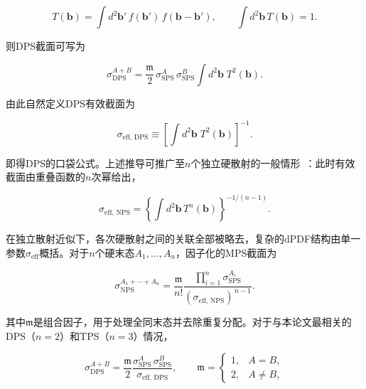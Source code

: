 \begin{equation}
  \label{eq:overlap-function}
  T(\mathbf{b}) = \int d^2\mathbf{b}' \, f(\mathbf{b}') \, f(\mathbf{b} - \mathbf{b}') ,
  \qquad
  \int d^2\mathbf{b} \, T(\mathbf{b}) = 1 .
\end{equation}

则DPS截面可写为

\begin{equation}
  \label{eq:dps-factorized-result}
  \sigma_{\mathrm{DPS}}^{A+B}
  =
  \frac{\mathfrak{m}}{2} \,
  \sigma_{\mathrm{SPS}}^{A} \,
  \sigma_{\mathrm{SPS}}^{B}
  \int d^2\mathbf{b} \; T^2(\mathbf{b}) .
\end{equation}

由此自然定义DPS有效截面为

\begin{equation}
  \label{eq:sigma-eff-dps-def}
  \sigma_{\mathrm{eff},\,\mathrm{DPS}} \equiv \left[ \int d^2\mathbf{b} \; T^2(\mathbf{b}) \right]^{-1} .
\end{equation}

即得DPS的口袋公式。上述推导可推广至$n$个独立硬散射的一般情形~\cite{denterriaDoubleTripleNparton2017}：此时有效截面由重叠函数的$n$次幂给出，

\begin{equation}
  \sigma_{\mathrm{eff},\,\mathrm{NPS}} = \left\{ \int d^2\mathbf{b} \, T^n(\mathbf{b}) \right\}^{-1/(n-1)} .
\end{equation}

在独立散射近似下，各次硬散射之间的关联全部被略去，复杂的dPDF结构由单一参数$\sigma_{\mathrm{eff}}$概括。对于$n$个硬末态$A_1,\ldots,A_n$，因子化的MPS截面为

\begin{equation}
  \label{eq:nps-pocket}
  \sigma_{\mathrm{NPS}}^{A_1+\cdots+A_n}
  =
  \frac{\mathfrak{m}}{n!}
  \frac{\prod_{i=1}^{n}\sigma_{\mathrm{SPS}}^{A_i}}
       {(\sigma_{\mathrm{eff},\,\mathrm{NPS}})^{\,n-1}} .
\end{equation}

其中$\mathfrak{m}$是组合因子，用于处理全同末态并去除重复分配。对于与本论文最相关的DPS（$n=2$）和TPS（$n=3$）情况，

\begin{equation}
  \label{eq:dps-pocket}
  \sigma_{\mathrm{DPS}}^{A+B}
  =
  \frac{\mathfrak{m}}{2}
  \frac{\sigma_{\mathrm{SPS}}^{A}\,\sigma_{\mathrm{SPS}}^{B}}
       {\sigma_{\mathrm{eff},\,\mathrm{DPS}}},
  \qquad
  \mathfrak{m}=
  \begin{cases}
    1, & A = B,\\
    2, & A \neq B,
  \end{cases}
\end{equation}

